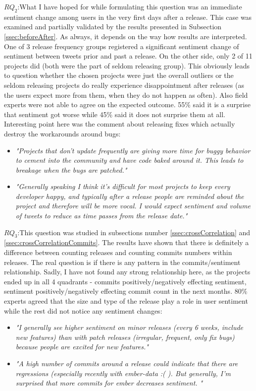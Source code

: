 \textbf{$RQ_{2}$}:What I have hoped for while formulating this question was an immediate sentiment change among users in the very first days after a release. This case was examined and partially validated by the results presented in Subsection \ref{ssec:beforeAfter}. As always, it depends on the way how results are interpreted. One of 3 release frequency groups registered a significant sentiment change of sentiment between tweets prior and past a release. On the other side, only 2 of 11 projects did (both were the part of seldom releasing group). This obviously leads to question whether the chosen projects were just the overall outliers or the seldom releasing projects do really experience disappointment after releases (as the users expect more from them, when they do not happen as often). Also field experts were not able to agree on the expected outcome. 55\% said  it is a surprise that sentiment got worse while 45\% said it does not surprise them at all. Interesting point here was the comment about releasing fixes which actually destroy the workarounds around bugs:
\begin{itemize}
\item \textit{"Projects that don't update frequently are giving more time for buggy behavior to cement into the community and have code baked around it. This leads to breakage when the bugs are patched."}
\item \textit{"Generally speaking I think it's difficult for most projects to keep every developer happy, and typically after a release people are reminded about the project and therefore will be more vocal. I would expect sentiment and volume of tweets to reduce as time passes from the release date."}
\end{itemize}

\textbf{$RQ_{3}$}:This question was studied in subsections number \ref{ssec:crossCorrelation} and \ref{ssec:crossCorrelationCommits}. The results have shown that there is definitely a difference between counting releases and counting commits numbers within releases. The real question is if there is any pattern in the commits/sentiment relationship. Sadly, I have not found any strong relationship here, as the projects ended up in all 4 quadrants - commits positively/negatively effecting sentiment, sentiment positively/negatively effecting commit count in the next months. 80\% experts agreed that the size and type of the release play a role in user sentiment while the rest did not notice any sentiment changes:
\begin{itemize}
\item \textit{"I generally see higher sentiment on minor releases (every 6 weeks, include new features) than with patch releases (irregular, frequent, only fix bugs) because people are excited for new features."}
\item \textit{"A high number of commits around a release could indicate that there are regressions (especially recently with ember-data :( ). But generally, I'm surprised that more commits for ember decreases sentiment. "}
\end{itemize}

